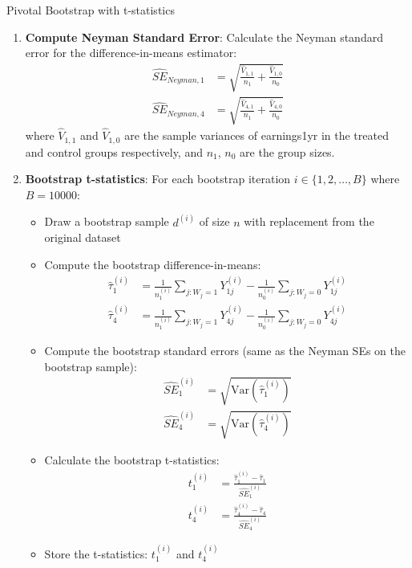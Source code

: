 \documentclass[11pt]{article}
\numberwithin{equation}{section}
\begin{document}
\begin{algorithm}
    \caption{Pivotal Bootstrap with t-statistics}
    \label{alg:pivotal_bootstrap}
    \begin{enumerate}
        \item \textbf{Compute Neyman Standard Error}: Calculate the Neyman standard error for the difference-in-means estimator:
        \begin{align}
            \hat{SE}_{Neyman,1} &= \sqrt{\frac{\hat{V}_{1,1}}{n_1} + \frac{\hat{V}_{1,0}}{n_0}} \\
            \hat{SE}_{Neyman,4} &= \sqrt{\frac{\hat{V}_{4,1}}{n_1} + \frac{\hat{V}_{4,0}}{n_0}}
        \end{align}
        where $\hat{V}_{1,1}$ and $\hat{V}_{1,0}$ are the sample variances of earnings1yr in the treated and control groups respectively, and $n_1$, $n_0$ are the group sizes.
        
        \item \textbf{Bootstrap t-statistics}: For each bootstrap iteration $i \in \{1, 2, \ldots, B\}$ where $B = 10000$:
        \begin{itemize}
            \item Draw a bootstrap sample $d^{(i)}$ of size $n$ with replacement from the original dataset
            \item Compute the bootstrap difference-in-means:
            \begin{align}
                \hat{\tau}^{(i)}_1 &= \frac{1}{n^{(i)}_1} \sum_{j: W_j = 1} Y_{1j}^{(i)} - \frac{1}{n^{(i)}_0} \sum_{j: W_j = 0} Y_{1j}^{(i)} \\
                \hat{\tau}^{(i)}_4 &= \frac{1}{n^{(i)}_1} \sum_{j: W_j = 1} Y_{4j}^{(i)} - \frac{1}{n^{(i)}_0} \sum_{j: W_j = 0} Y_{4j}^{(i)}
            \end{align}
            \item Compute the bootstrap standard errors (same as the Neyman SEs on the bootstrap sample):
            \begin{align}
                \hat{SE}^{(i)}_1 &= \sqrt{\text{Var}(\hat{\tau}^{(i)}_1)} \\
                \hat{SE}^{(i)}_4 &= \sqrt{\text{Var}(\hat{\tau}^{(i)}_4)}
            \end{align}
            \item Calculate the bootstrap t-statistics:
            \begin{align}
                t^{(i)}_1 &= \frac{\hat{\tau}^{(i)}_1 - \hat{\tau}_1}{\hat{SE}^{(i)}_1} \\
                t^{(i)}_4 &= \frac{\hat{\tau}^{(i)}_4 - \hat{\tau}_4}{\hat{SE}^{(i)}_4}
            \end{align}
            \item Store the t-statistics: $t^{(i)}_1$ and $t^{(i)}_4$
        \end{itemize}
        

\end{enumerate}
\end{algorithm}
\end{document}
